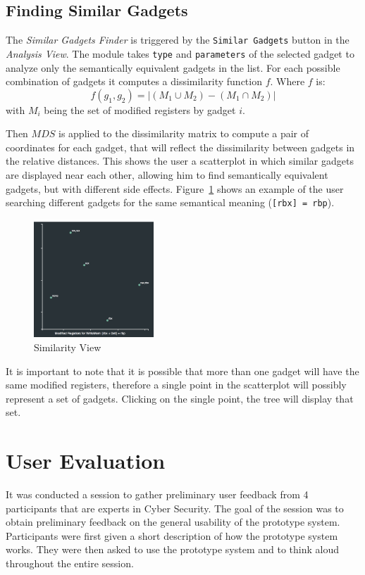\documentclass[twocolumn, 11pt]{article}
\begin{document}
\subsection{Finding Similar Gadgets}
The \textit{Similar Gadgets Finder} is triggered by the \texttt{Similar Gadgets} button in the \textit{Analysis View}. The module takes \texttt{type} and \texttt{parameters} of the selected gadget to analyze only the semantically equivalent gadgets in the list. For each possible combination of gadgets it computes a dissimilarity function $f$. Where $f$ is:
$$
f(g_1, g_2) = |(M_1 \cup M_2) - (M_1 \cap M_2)|
$$
with $M_i$ being the set of modified registers by gadget $i$.

Then $MDS$ is applied to the dissimilarity matrix to compute a pair of coordinates for each gadget, that will reflect the dissimilarity between gadgets in the relative distances. This shows the user a scatterplot in which similar gadgets are displayed near each other, allowing him to find semantically equivalent gadgets, but with different side effects. Figure~\ref{fig:mds} shows an example of the user searching different gadgets for the same semantical meaning (\texttt{[rbx] = rbp}).

\begin{figure}[htb]
\centering
 \includegraphics[width=0.4\textwidth]{mds}
 \caption{Similarity View}\label{fig:mds}
\end{figure}

It is important to note that it is possible that more than one gadget will have the same modified registers, therefore a single point in the scatterplot will possibly represent a set of gadgets. Clicking on the single point, the tree will display that set.

\section{User Evaluation}
It was conducted a session to gather preliminary user feedback from 4 participants that are experts in Cyber Security. The goal of the session was to obtain preliminary feedback on the general usability of the prototype system. Participants were first given a short description of how the prototype system works. They were then asked to use the prototype system and to think aloud throughout the entire session.
\end{document}
